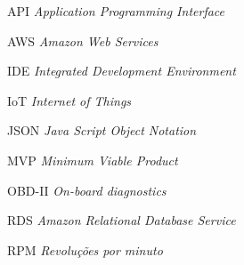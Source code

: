 
\begin{basedescript}{\desclabelstyle{\pushlabel}\desclabelwidth{6em}}
\item[{API}] \textit{Application Programming Interface}
\item[{AWS}] \textit{Amazon Web Services}
\item[{IDE}] \textit{Integrated Development Environment}
\item[{IoT}] \textit{Internet of Things}
\item[{JSON}] \textit{Java Script Object Notation}
\item[{MVP}] \textit{Minimum Viable Product}
\item[{OBD-II}] \textit{On-board diagnostics}
\item[{RDS}] \textit{Amazon Relational Database Service}
\item[{RPM}] \textit{Revoluções por minuto}

\end{basedescript}